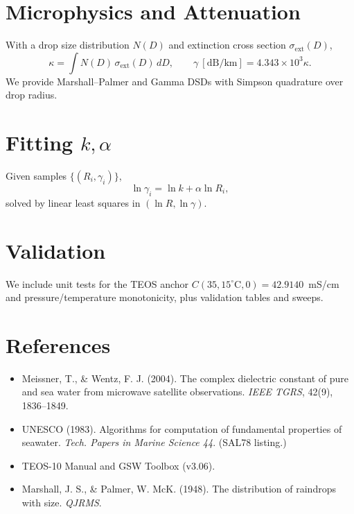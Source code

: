 \documentclass[11pt]{article}
\begin{document}
\section{Microphysics and Attenuation}
With a drop size distribution $N(D)$ and extinction cross section $\sigma_{\mathrm{ext}}(D)$,
\begin{equation}
\kappa = \int N(D)\,\sigma_{\mathrm{ext}}(D)\,dD, \qquad \gamma~[\mathrm{dB/km}] = 4.343\times10^3 \kappa.
\end{equation}
We provide Marshall--Palmer and Gamma DSDs with Simpson quadrature over drop radius.

\section{Fitting $k,\alpha$}
Given samples $\{(R_i,\gamma_i)\}$,
\begin{equation}
\ln \gamma_i = \ln k + \alpha \ln R_i,
\end{equation}
solved by linear least squares in $(\ln R,\ln \gamma)$.

\section{Validation}
We include unit tests for the TEOS anchor $C(35,15^\circ\mathrm{C},0)=42.9140$~mS/cm and pressure/temperature monotonicity,
plus validation tables and sweeps.

\section{References}
\begin{itemize}
\item Meissner, T., \& Wentz, F. J. (2004). The complex dielectric constant of pure and sea water from microwave satellite observations. \emph{IEEE TGRS}, 42(9), 1836--1849.
\item UNESCO (1983). Algorithms for computation of fundamental properties of seawater. \emph{Tech. Papers in Marine Science 44}. (SAL78 listing.)
\item TEOS-10 Manual and GSW Toolbox (v3.06).
\item Marshall, J. S., \& Palmer, W. McK. (1948). The distribution of raindrops with size. \emph{QJRMS}.
\end{itemize}
\end{document}

